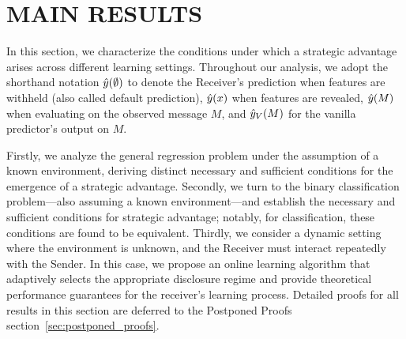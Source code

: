 \section{MAIN RESULTS}\label{sec:main_results}

In this section, we characterize the conditions under which a strategic advantage arises across different learning settings. Throughout our analysis, we adopt the shorthand notation $\hat{y}(\emptyset)$ to denote the Receiver's prediction when features are withheld (also called default prediction), $\hat{y}(x)$ when features are revealed, $\hat{y}(M)$ when evaluating on the observed message $M$, and $\hat{y}_V(M)$ for the vanilla predictor's output on $M$. 

Firstly, we analyze the general regression problem under the assumption of a known environment, deriving distinct necessary and sufficient conditions for the emergence of a strategic advantage. Secondly, we turn to the binary classification problem—also assuming a known environment—and establish the necessary and sufficient conditions for strategic advantage; notably, for classification, these conditions are found to be equivalent. Thirdly, we consider a dynamic setting where the environment is unknown, and the Receiver must interact repeatedly with the Sender. In this case, we propose an online learning algorithm that adaptively selects the appropriate disclosure regime and provide theoretical performance guarantees for the receiver’s learning process. Detailed proofs for all results in this section are deferred to the Postponed Proofs section~\ref{sec:postponed_proofs}.


%

